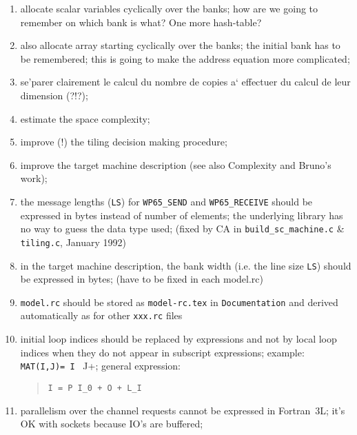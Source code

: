\begin{enumerate}

  \item allocate scalar variables cyclically over the banks; how are we
        going to remember on which bank is what? One more hash-table?

  \item also allocate array starting cyclically over the banks; the initial
        bank has to be remembered; this is going to make the address equation
        more complicated;

  \item se'parer clairement le calcul du nombre de copies
        a` effectuer du calcul de leur dimension (?!?);

  \item estimate the space complexity;

  \item improve (!) the tiling decision making procedure;

  \item improve the target machine description (see also Complexity and 
        Bruno's work);

  \item {}
        the message lengths (\verb+LS+) 
        for \verb+WP65_SEND+ and \verb+WP65_RECEIVE+ should be
        expressed in bytes instead of number of elements; 
        the underlying library has no way to guess the data type used;
        (fixed by CA in \verb+build_sc_machine.c+ \& 
        \verb+tiling.c+, January 1992)

  \item in the target machine description, the bank width (i.e. the
        line size \verb+LS+) should be expressed in bytes;
        (have to be fixed in each model.rc)

  \item \verb+model.rc+ should be stored as \verb+model-rc.tex+ in
        \verb+Documentation+ and derived automatically as for other
        \verb+xxx.rc+ files

  \item initial loop indices should be replaced by expressions and not
        by local loop indices when they do not appear in subscript
        expressions; example: \verb+MAT(I,J)= I + J+; general
        expression:
        \begin{quote}
        \verb/I = P I_0 + O + L_I/
        \end{quote}

  \item parallelism over the channel requests cannot be expressed in
        Fortran~3L; it's OK with sockets because IO's are buffered;


\end{enumerate}
